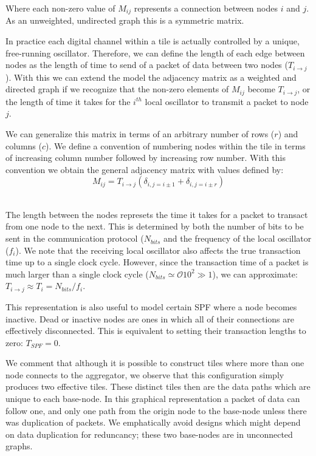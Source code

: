 Where each non-zero value of $M_{ij}$ represents a connection between nodes $i$ and $j$.
As an unweighted, undirected graph this is a symmetric matrix.

In practice each digital channel within a tile is actually controlled by a unique, free-running oscillator.
Therefore, we can define the length of each edge between nodes as the length of time to send of a packet of data between two nodes ($T_{i\rightarrow j}$).
With this we can extend the model the adjacency matrix as a weighted and directed graph if we recognize that the non-zero elements of $M_{ij}$ become $T_{i\rightarrow j}$, or the length of time it takes for the $i^{th}$ local oscillator to transmit a packet to node $j$.

We can generalize this matrix in terms of an arbitrary number of rows ($r$) and columns ($c$).
We define a convention of numbering nodes within the tile in terms of increasing column number followed by increasing row number.
With this convention we obtain the general adjacency matrix with values defined by:
\begin{equation}
  M_{ij} = T_{i\rightarrow j}(\delta_{i,j=i\pm 1} + \delta_{i,j=i\pm r})
\end{equation}~\label{eq:adjacency_comp}

The length between the nodes represets the time it takes for a packet to transact from one node to the next.
This is determined by both the number of bits to be sent in the communication protocol ($N_{bits}$ and the frequency of the local oscillator ($f_{i}$).
We note that the receiving local oscillator also affects the true transaction time up to a single clock cycle.
However, since the transaction time of a packet is much larger than a single clock cycle ($N_{bits} \simeq \mathcal{O}10^{2} \gg 1$), we can approximate: $T_{i\rightarrow j} \approx T_{i} = N_{bits}/f_{i}$.

This representation is also useful to model certain SPF where a node becomes inactive.
Dead or inactive nodes are ones in which all of their connections are effectively disconnected.
This is equivalent to setting their transaction lengths to zero: $T_{SPF} = 0$.

We comment that although it is possible to construct tiles where more than one node connects to the aggregator, we observe that this configuration simply produces two effective tiles.
These distinct tiles then are the data paths which are unique to each base-node.
In this graphical representation a packet of data can follow one, and only one path from the origin node to the base-node unless there was duplication of packets.
We emphatically avoid designs which might depend on data duplication for reduncancy; these two base-nodes are in unconnected graphs.

